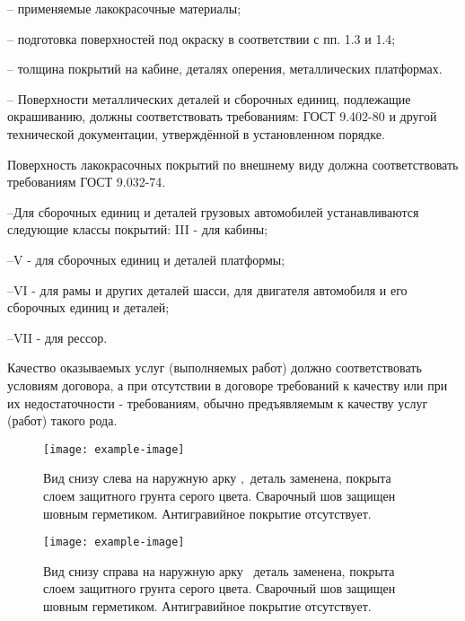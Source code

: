 {   -- применяемые лакокрасочные материалы;
   
   -- подготовка поверхностей под окраску в соответствии с пп. 1.3 и 1.4;
   
   -- толщина покрытий на кабине, деталях оперения, металлических платформах.
   
   
   
   
   -- Поверхности металлических деталей и сборочных единиц, подлежащие окрашиванию, должны соответствовать требованиям: ГОСТ 9.402-80 и другой технической документации, утверждённой в установленном порядке.
   
   
   Поверхность лакокрасочных покрытий по внешнему виду должна соответствовать требованиям ГОСТ 9.032-74.
   
   --Для сборочных единиц и деталей грузовых автомобилей устанавливаются следующие классы покрытий:
   III - для кабины;
   
   --V - для сборочных единиц и деталей платформы;
   
   --VI - для рамы и других деталей шасси, для двигателя автомобиля и его сборочных единиц и деталей;
   
   --VII - для рессор.
   
   
      
   \par 
   Качество  оказываемых  услуг  (выполняемых  работ)  должно
   соответствовать  условиям  договора,  а  при  отсутствии в договоре  требований  к  качеству  или  при их недостаточности - требованиям,
   обычно предъявляемым к качеству услуг (работ) такого рода.
   
   \begin{figure}[H]\centering
   	\parbox[t]{0.49\textwidth}
   	{\centering
   		\texttt{[image: example-image]}
   		\caption{\footnotesize {Вид снизу слева на наружную арку ,\, деталь заменена, покрыта слоем защитного грунта серого цвета. Сварочный шов защищен шовным герметиком. Антигравийное покрытие отсутствует.}}
   		\label{аркалевая}}
   	\hfil \hfil
   	\parbox[t]{0.49\textwidth}
   	{\centering
   		\texttt{[image: example-image]}
   		\caption{\footnotesize {Вид снизу справа на наружную арку \tc\, деталь заменена, покрыта слоем защитного грунта серого цвета. Сварочный шов защищен шовным герметиком. Антигравийное покрытие отсутствует.}}
   		\label{аркаправая}}
   \end{figure}

}
